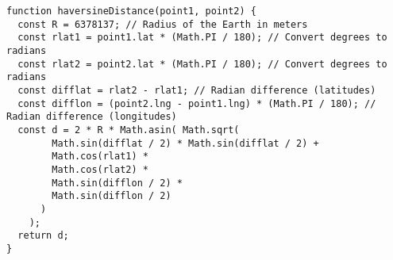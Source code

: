 \begin{verbatim}
function haversineDistance(point1, point2) {
  const R = 6378137; // Radius of the Earth in meters
  const rlat1 = point1.lat * (Math.PI / 180); // Convert degrees to radians
  const rlat2 = point2.lat * (Math.PI / 180); // Convert degrees to radians
  const difflat = rlat2 - rlat1; // Radian difference (latitudes)
  const difflon = (point2.lng - point1.lng) * (Math.PI / 180); // Radian difference (longitudes)
  const d = 2 * R * Math.asin( Math.sqrt(
        Math.sin(difflat / 2) * Math.sin(difflat / 2) +
        Math.cos(rlat1) *
        Math.cos(rlat2) *
        Math.sin(difflon / 2) *
        Math.sin(difflon / 2)
      )
    );
  return d;
}
\end{verbatim}